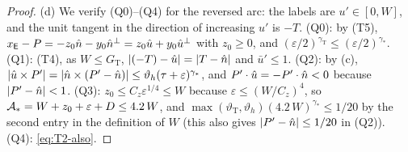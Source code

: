 \begin{proof}
(d) We verify (Q0)--(Q4) for the reversed arc: the labels are $u'\in[0,W]$, and the unit tangent in the direction of increasing
$u'$ is $-T$. (Q0): by (T5), $x_{\mathsf E}-P=-z_0\hat n-y_0\hat n^\perp=z_0\hat u+y_0\hat u^\perp$ with $z_0\ge0$, and
$(\varepsilon/2)^{\gamma_{\mathrm T}}\le(\varepsilon/2)^{\gamma_*}$. (Q1): (T4), as $W\le G_{\mathrm T}$, $|(-T)-\hat u|=|T-\hat n|$ and $\bar u'\le1$.
(Q2): by (c), $|\hat u\times P'|=|\hat n\times(P'-\hat n)|\le\vartheta_h(\tau+\varepsilon)^{\gamma_*}$, and $P'\cdot\hat u=-P'\cdot\hat n<0$
because $|P'-\hat n|<1$. (Q3): $z_0\le C_z\varepsilon^{1/4}\le W$ because $\varepsilon\le(W/C_z)^4$, so
$\mathcal A_*=W+z_0+\varepsilon+D\le4.2\,W$, and $\max(\vartheta_{\mathrm T},\vartheta_h)(4.2\,W)^{\gamma_*}\le1/20$ by the second entry in the
definition of $W$ (this also gives $|P'-\hat n|\le1/20$ in (Q2)). (Q4): \eqref{eq:T2-also}.
\end{proof}

